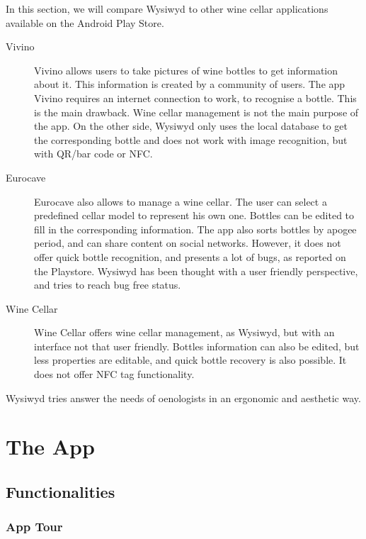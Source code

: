 In this section, we will compare Wysiwyd to other wine cellar applications available on the Android Play Store.

\begin{description}
	\item[Vivino] Vivino allows users to take pictures of wine bottles to get information about it. This information is created by a community of users. The app Vivino requires an internet connection to work, to recognise a bottle. This is the main drawback. Wine cellar management is not the main purpose of the app. On the other side, Wysiwyd only uses the local database to get the corresponding bottle and does not work with image recognition, but with QR/bar code or NFC.
	
	\item[Eurocave] Eurocave also allows to manage a wine cellar. The user can select a predefined cellar model to represent his own one. Bottles can be edited to fill in the corresponding information. The app also sorts bottles by apogee period, and can share content on social networks. However, it does not offer quick bottle recognition, and presents a lot of bugs, as reported on the Playstore. Wysiwyd has been thought with a user friendly perspective, and tries to reach bug free status.
	
	\item[Wine Cellar] Wine Cellar offers wine cellar management, as Wysiwyd, but with an interface not that user friendly. Bottles information can also be edited, but less properties are editable, and quick bottle recovery is also possible. It does not offer NFC tag functionality.
	
\end{description}

	Wysiwyd tries answer the needs of oenologists in an ergonomic and aesthetic way.

\newpage
\section{The App}

\subsection{Functionalities}

\subsubsection{App Tour}

